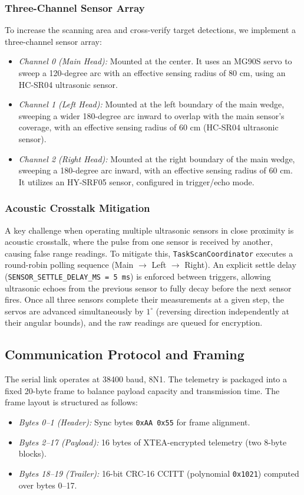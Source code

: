 \documentclass[conference]{IEEEtran}
\begin{document}
\subsubsection{Three-Channel Sensor Array}
To increase the scanning area and cross-verify target detections, we implement a three-channel sensor array:
\begin{itemize}
    \item \textit{Channel 0 (Main Head):} Mounted at the center. It uses an MG90S servo to sweep a 120-degree arc with an effective sensing radius of $80\text{ cm}$, using an HC-SR04 ultrasonic sensor.
    \item \textit{Channel 1 (Left Head):} Mounted at the left boundary of the main wedge, sweeping a wider 180-degree arc inward to overlap with the main sensor's coverage, with an effective sensing radius of $60\text{ cm}$ (HC-SR04 ultrasonic sensor).
    \item \textit{Channel 2 (Right Head):} Mounted at the right boundary of the main wedge, sweeping a 180-degree arc inward, with an effective sensing radius of $60\text{ cm}$. It utilizes an HY-SRF05 sensor, configured in trigger/echo mode.
\end{itemize}

\subsubsection{Acoustic Crosstalk Mitigation}
A key challenge when operating multiple ultrasonic sensors in close proximity is acoustic crosstalk, where the pulse from one sensor is received by another, causing false range readings. To mitigate this, \texttt{TaskScanCoordinator} executes a round-robin polling sequence (Main $\rightarrow$ Left $\rightarrow$ Right). An explicit settle delay (\texttt{SENSOR\_SETTLE\_DELAY\_MS = 5 ms}) is enforced between triggers, allowing ultrasonic echoes from the previous sensor to fully decay before the next sensor fires. Once all three sensors complete their measurements at a given step, the servos are advanced simultaneously by $1^\circ$ (reversing direction independently at their angular bounds), and the raw readings are queued for encryption.

\subsection{Communication Protocol and Framing}
\label{subsec:protocol}
The serial link operates at 38400 baud, 8N1. The telemetry is packaged into a fixed 20-byte frame to balance payload capacity and transmission time. The frame layout is structured as follows:
\begin{itemize}
    \item \textit{Bytes 0--1 (Header):} Sync bytes \texttt{0xAA 0x55} for frame alignment.
    \item \textit{Bytes 2--17 (Payload):} 16 bytes of XTEA-encrypted telemetry (two 8-byte blocks).
    \item \textit{Bytes 18--19 (Trailer):} 16-bit CRC-16 CCITT (polynomial \texttt{0x1021}) computed over bytes 0--17.
\end{itemize}
\end{document}

